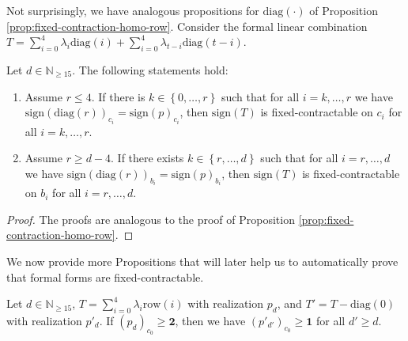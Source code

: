 Not surprisingly, we have analogous propositions for \( \mathrm{diag}(\cdot) \) of Proposition \ref{prop:fixed-contraction-homo-row}. Consider the formal linear combination \(  T = \sum_{i=0}^{4}  \lambda_{i} \mathrm{diag}(i) + \sum_{i=0}^{4}  \lambda_{t-i} \mathrm{diag}(t-i) \).

\begin{proposition}\label{prop:fixed-contraction-homo-diag}
    Let \( d \in \mathbb{N}_{\geq 15} \). The following statements hold:
    \begin{enumerate}
        \item  Assume \( r \leq 4 \). If there is \( k \in \left\{ 0, \dots, r \right\} \) such that for all \( i = k, \dots, r\) we have \(  \mathrm{sign}(\mathrm{diag}(r))_{c_i} = \mathrm{sign}(p)_{c_i} \),
        then  \( \mathrm{sign}(T) \) is fixed-contractable on \( c_i \) for all \( i = k, \dots, r \).
        \item Assume \( r \geq d-4 \).
        If there exists \( k \in \left\{ r, \dots, d \right\} \) such that for all \( i = r, \dots, d\) we have \(  \mathrm{sign}(\mathrm{diag}(r))_{b_i} = \mathrm{sign}(p)_{b_i} \),
        then  \( \mathrm{sign}(T) \) is fixed-contractable on \( b_i \) for all \( i = r, \dots, d \).
    \end{enumerate}
\end{proposition}

\begin{proof}
    The proofs are analogous to the proof of Proposition \ref{prop:fixed-contraction-homo-row}.
\end{proof}


We now provide more Propositions that will later help us to automatically prove that formal forms are fixed-contractable.

\begin{proposition}\label{prop:row_homo_diag}
    Let \( d \in \mathbb{N}_{\geq 15} \), \( T = \sum_{i=0}^4 \lambda_i \mathrm{row}(i)\) with realization \( p_d \), and \( T' = T - \mathrm{diag}(0) \) with realization \( p'_d \). If \( (p_d)_{c_0} \geq \mathbf{2} \), then we have \( (p'_{d'})_{c_0} \geq \mathbf 1 \) for all \( d' \geq d \).
\end{proposition}

